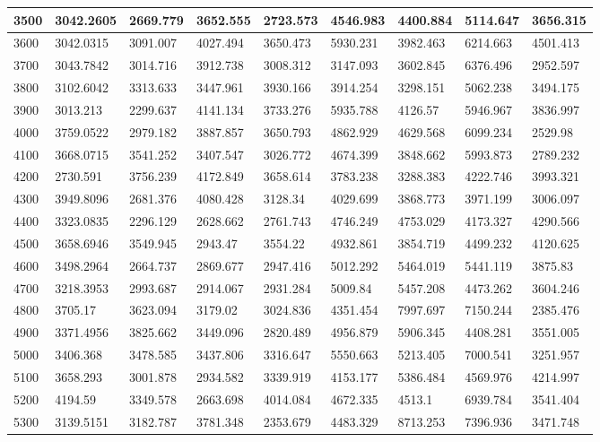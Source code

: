 \begin{table}[]
{\begin{tabular}{|l|l|l|l|l|l|l|l|l|}
3500 & 3042.2605 & 2669.779 & 3652.555 & 2723.573 & 4546.983 & 4400.884 & 5114.647 & 3656.315 \\ \hline
3600 & 3042.0315 & 3091.007 & 4027.494 & 3650.473 & 5930.231 & 3982.463 & 6214.663 & 4501.413 \\ \hline
3700 & 3043.7842 & 3014.716 & 3912.738 & 3008.312 & 3147.093 & 3602.845 & 6376.496 & 2952.597 \\ \hline
3800 & 3102.6042 & 3313.633 & 3447.961 & 3930.166 & 3914.254 & 3298.151 & 5062.238 & 3494.175 \\ \hline
3900 & 3013.213 & 2299.637 & 4141.134 & 3733.276 & 5935.788 & 4126.57 & 5946.967 & 3836.997 \\ \hline
4000 & 3759.0522 & 2979.182 & 3887.857 & 3650.793 & 4862.929 & 4629.568 & 6099.234 & 2529.98 \\ \hline
4100 & 3668.0715 & 3541.252 & 3407.547 & 3026.772 & 4674.399 & 3848.662 & 5993.873 & 2789.232 \\ \hline
4200 & 2730.591 & 3756.239 & 4172.849 & 3658.614 & 3783.238 & 3288.383 & 4222.746 & 3993.321 \\ \hline
4300 & 3949.8096 & 2681.376 & 4080.428 & 3128.34 & 4029.699 & 3868.773 & 3971.199 & 3006.097 \\ \hline
4400 & 3323.0835 & 2296.129 & 2628.662 & 2761.743 & 4746.249 & 4753.029 & 4173.327 & 4290.566 \\ \hline
4500 & 3658.6946 & 3549.945 & 2943.47 & 3554.22 & 4932.861 & 3854.719 & 4499.232 & 4120.625 \\ \hline
4600 & 3498.2964 & 2664.737 & 2869.677 & 2947.416 & 5012.292 & 5464.019 & 5441.119 & 3875.83 \\ \hline
4700 & 3218.3953 & 2993.687 & 2914.067 & 2931.284 & 5009.84 & 5457.208 & 4473.262 & 3604.246 \\ \hline
4800 & 3705.17 & 3623.094 & 3179.02 & 3024.836 & 4351.454 & 7997.697 & 7150.244 & 2385.476 \\ \hline
4900 & 3371.4956 & 3825.662 & 3449.096 & 2820.489 & 4956.879 & 5906.345 & 4408.281 & 3551.005 \\ \hline
5000 & 3406.368 & 3478.585 & 3437.806 & 3316.647 & 5550.663 & 5213.405 & 7000.541 & 3251.957 \\ \hline
5100 & 3658.293 & 3001.878 & 2934.582 & 3339.919 & 4153.177 & 5386.484 & 4569.976 & 4214.997 \\ \hline
5200 & 4194.59 & 3349.578 & 2663.698 & 4014.084 & 4672.335 & 4513.1 & 6939.784 & 3541.404 \\ \hline
5300 & 3139.5151 & 3182.787 & 3781.348 & 2353.679 & 4483.329 & 8713.253 & 7396.936 & 3471.748 \\ \hline

\end{tabular}}
\end{table}
